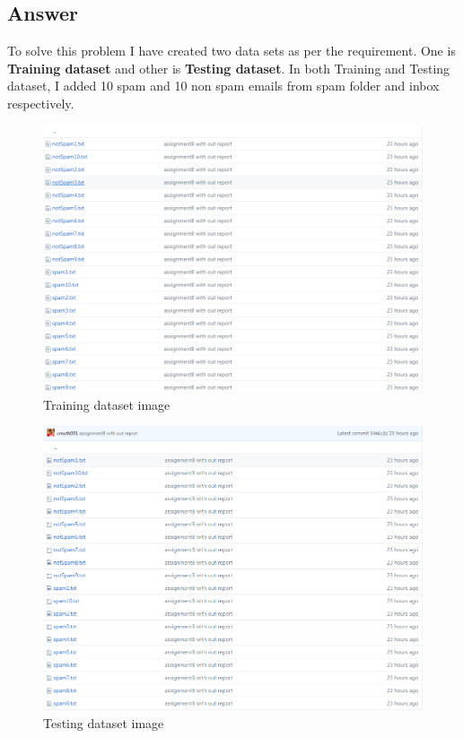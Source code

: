 \documentclass[letterpaper,11pt]{article}
\begin{document}
\subsection*{Answer}
To solve this problem I have created two data sets as per the requirement. One is \textbf{Training dataset} and other is \textbf{ Testing dataset}. In both Training and Testing dataset, I added 10 spam and 10 non spam emails from spam folder and inbox respectively. 
\begin{figure}[h]
\centering
\includegraphics[width=\textwidth]{trainDataSetImage.png}
\caption{ Training dataset  image }
\label{fig:q2followers}
\end{figure}

\begin{figure}[h]
\centering
\includegraphics[width=\textwidth]{testDataSetImage.png}
\caption{ Testing dataset  image}
\label{fig:q2followers}
\end{figure}
\end{document}
